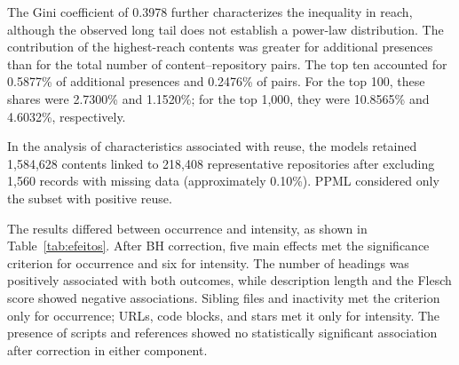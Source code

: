 \documentclass[conference]{IEEEtran}
\begin{document}
The Gini coefficient of 0.3978 further characterizes the inequality in reach, although the observed long tail does not establish a power-law distribution. The contribution of the highest-reach contents was greater for additional presences than for the total number of content--repository pairs. The top ten accounted for 0.5877\% of additional presences and 0.2476\% of pairs. For the top 100, these shares were 2.7300\% and 1.1520\%; for the top 1,000, they were 10.8565\% and 4.6032\%, respectively.

In the analysis of characteristics associated with reuse, the models retained 1,584,628 contents linked to 218,408 representative repositories after excluding 1,560 records with missing data (approximately 0.10\%). PPML considered only the subset with positive reuse.

The results differed between occurrence and intensity, as shown in Table~\ref{tab:efeitos}. After BH correction, five main effects met the significance criterion for occurrence and six for intensity. The number of headings was positively associated with both outcomes, while description length and the Flesch score showed negative associations. Sibling files and inactivity met the criterion only for occurrence; URLs, code blocks, and stars met it only for intensity. The presence of scripts and references showed no statistically significant association after correction in either component.
\end{document}
